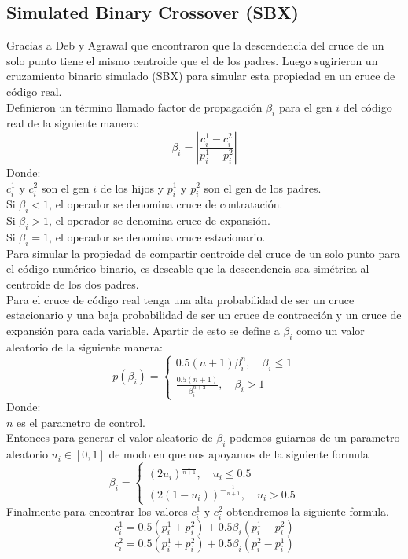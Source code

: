 \documentclass[10pt]{article}
\begin{document}
\subsection{Simulated Binary Crossover (SBX)}
Gracias a Deb y Agrawal que encontraron que la descendencia del cruce de un solo punto tiene el mismo centroide que el de los padres. Luego sugirieron un cruzamiento binario simulado (SBX) para simular esta propiedad en un cruce de código real.\\
Definieron un término llamado factor de propagación $\beta_{i}$ para el gen $i$ del código real de la siguiente manera:
\[\beta_{i}=\left|\frac{c_{i}^{1}-c_{i}^{2}}{p_{i}^{1}-p_{i}^{2}}\right|\]
Donde:
\\
\(\displaystyle c_{i}^{1}\) y \(\displaystyle c_{i}^{2}\) son el gen $i$ de los hijos y \(\displaystyle p_{i}^1\) y \(\displaystyle p_{i}^2\) son el gen de los padres.\\\vspace{0.25cm}
Si $\beta_{i}<1$, el operador se denomina cruce de contratación.\\\vspace{0.25cm}
Si $\beta_{i}>1$, el operador se denomina cruce de expansión.\\\vspace{0.25cm}
Si $\beta_{i}=1$, el operador se denomina cruce estacionario.\\\vspace{0.25cm}
Para simular la propiedad de compartir centroide del cruce de un solo punto para el código numérico binario, es deseable que la descendencia sea simétrica al centroide de los dos padres.\\
Para el cruce de código real tenga una alta probabilidad de ser un cruce estacionario y una baja probabilidad de ser un cruce de contracción y un cruce de expansión para cada variable. Apartir de esto se define a $\beta_{i}$ como un valor aleatorio de la siguiente manera:
\[p\left(\beta_{i}\right)=\left\{
\begin{aligned}
  0.5(n+1)\beta^{n}_{i},\quad\beta_{i}\leq 1\\
  \frac{0.5(n+1)}{\beta^{n+2}_{i}},\quad\beta_{i}>1
\end{aligned}
\right.\]
Donde:\\
\(\displaystyle n\) es el parametro de control.\\
Entonces para generar el valor aleatorio de \(\displaystyle\beta_{i}\) podemos guiarnos de un parametro aleatorio \(\displaystyle u_{i}\in[0,1]\) de modo en que nos apoyamos de la siguiente formula
\[\beta_{i}=\left\{
  \begin{aligned}
    \left(2u_{i}\right)^{\frac{1}{n+1}},\quad u_{i}\leq 0.5\\
    \left(2\left(1-u_{i}\right)\right)^{-\frac{1}{n+1}},\quad u_{i}>0.5
  \end{aligned}
\right.\]
Finalmente para encontrar los valores \(\displaystyle c_{i}^1\) y \(\displaystyle c_{i}^2\) obtendremos la siguiente formula.
\[c_{i}^{1}=0.5\left(p_{i}^{1}+p_{i}^{2}\right)+0.5\beta_{i}\left(p_{i}^{1}-p_{i}^{2}\right)\]
\[c_{i}^{2}=0.5\left(p_{i}^{1}+p_{i}^{2}\right)+0.5\beta_{i}\left(p_{i}^{2}-p_{i}^{1}\right)\]
\clearpage
\end{document}

